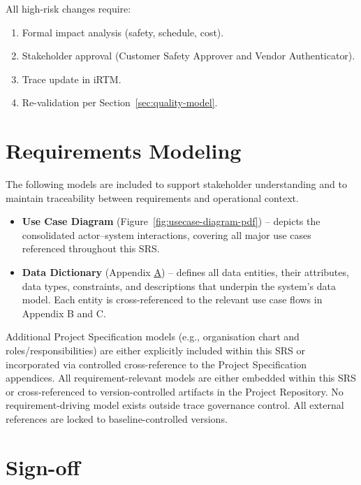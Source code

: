 \documentclass[11pt,a4paper]{article}
\let\origref\ref
\renewcommand{\ref}[1]{\uline{\origref{#1}}}%
\let\orighyperref\hyperref
\renewcommand{\hyperref}[2][]{\orighyperref[#1]{\uline{#2}}}%
\begin{document}
All high-risk changes require:
\begin{enumerate}[leftmargin=*,nosep]
  \item Formal impact analysis (safety, schedule, cost).
  \item Stakeholder approval (Customer Safety Approver and Vendor Authenticator).
  \item Trace update in iRTM.
  \item Re-validation per Section~\ref{sec:quality-model}.
\end{enumerate}

\section{Requirements Modeling}
\label{sec:req-modeling}

The following models are included to support stakeholder understanding and to maintain traceability between requirements and operational context.

\begin{itemize}[leftmargin=*,nosep]
  \item \textbf{Use Case Diagram} (Figure~\ref{fig:usecase-diagram-pdf}) -- depicts the consolidated actor--system interactions, covering all major use cases referenced throughout this SRS.
  \item \textbf{Data Dictionary} (Appendix \hyperref[app:data-dictionary]{A}) -- defines all data entities, their attributes, data types, constraints, and descriptions that underpin the system's data model. Each entity is cross-referenced to the relevant use case flows in Appendix B and C.
\end{itemize}

Additional Project Specification models (e.g., organisation chart and roles/responsibilities) are either explicitly included within this SRS or incorporated via controlled cross-reference to the Project Specification appendices. All requirement-relevant models are either embedded within this SRS or cross-referenced to version-controlled artifacts in the Project Repository. No requirement-driving model exists outside trace governance control. All external references are locked to baseline-controlled versions.

\section{Sign-off}
\label{sec:signoff}
\end{document}
